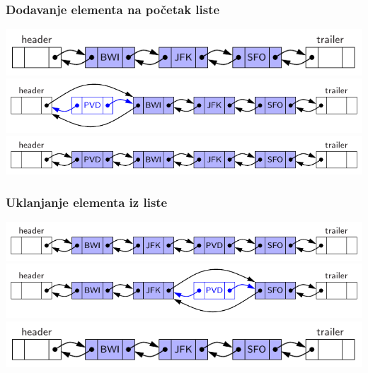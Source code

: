 \documentclass[compress,aspectratio=169]{beamer}
\begin{document}
\begin{frame}[fragile]
  \frametitle{Dodavanje elementa na početak liste}
  \begin{center}
    \includegraphics[scale=0.9]{asp-07-pic09a.pdf} \\
    \includegraphics[scale=0.9]{asp-07-pic09b.pdf} \\
    \includegraphics[scale=0.9]{asp-07-pic09c.pdf}
  \end{center}
\end{frame}

\begin{frame}[fragile]
  \frametitle{Uklanjanje elementa iz liste}
  \begin{center}
    \includegraphics[scale=0.9]{asp-07-pic10a.pdf} \\
    \includegraphics[scale=0.9]{asp-07-pic10b.pdf} \\
    \includegraphics[scale=0.9]{asp-07-pic10c.pdf}
  \end{center}
\end{frame}
\end{document}
